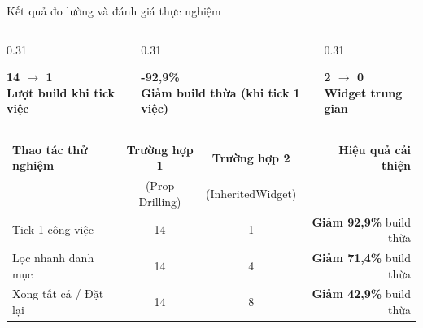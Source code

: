 \documentclass[aspectratio=169, 11pt]{beamer}
\begin{document}
\begin{frame}{Kết quả đo lường và đánh giá thực nghiệm}
  \vspace{-0.22cm}
  \begin{columns}[c, onlytextwidth]
    \begin{column}{0.31\textwidth}
      \begin{tcolorbox}[enhanced, colback=DarkMain!10, colframe=DarkMain, arc=3pt, halign=center, top=5pt, bottom=5pt]
        {\Huge\bfseries\color{DarkMain} 14 $\to$ 1}\\[2pt]
        {\footnotesize\bfseries Lượt build khi tick việc}
      \end{tcolorbox}
    \end{column}
    \hfill
    \begin{column}{0.31\textwidth}
      \begin{tcolorbox}[enhanced, colback=DarkMain!10, colframe=DarkMain, arc=3pt, halign=center, top=5pt, bottom=5pt]
        {\Huge\bfseries\color{DarkMain} -92,9\%}\\[2pt]
        {\footnotesize\bfseries Giảm build thừa (khi tick 1 việc)}
      \end{tcolorbox}
    \end{column}
    \hfill
    \begin{column}{0.31\textwidth}
      \begin{tcolorbox}[enhanced, colback=DarkMain!10, colframe=DarkMain, arc=3pt, halign=center, top=5pt, bottom=5pt]
        {\Huge\bfseries\color{DarkMain} 2 $\to$ 0}\\[2pt]
        {\footnotesize\bfseries Widget trung gian}
      \end{tcolorbox}
    \end{column}
  \end{columns}

  \vspace{0.10cm}
  \renewcommand{\arraystretch}{1.12}
  \setlength{\tabcolsep}{6.0pt}
  \fontsize{8.2pt}{11.0pt}\selectfont
  \centering
  \begin{tabular}{@{} l c c r @{}}
    \toprule[0.9pt]
    \textbf{Thao tác thử nghiệm} & \textbf{Trường hợp 1} & \textbf{Trường hợp 2} & \textbf{Hiệu quả cải thiện} \\
    & {\scriptsize\color{TextMuted}(Prop Drilling)} & {\scriptsize\color{TextMuted}(InheritedWidget)} & \\
    \midrule[0.5pt]
    Tick 1 công việc & 14 & 1 & \textbf{Giảm 92,9\%} build thừa \\
    Lọc nhanh danh mục & 14 & 4 & \textbf{Giảm 71,4\%} build thừa \\
    Xong tất cả / Đặt lại & 14 & 8 & \textbf{Giảm 42,9\%} build thừa \\
    \bottomrule[0.9pt]
  \end{tabular}


\end{frame}
\end{document}
